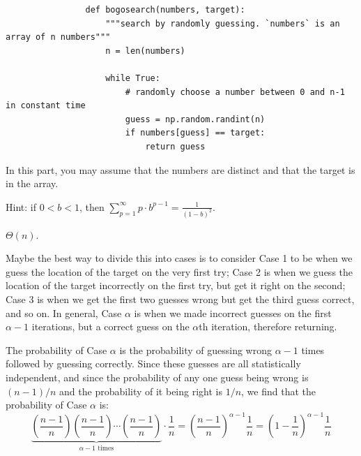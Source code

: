 \begin{prob}
\begin{subprobset}
\begin{subprob}
\begin{soln}
            \end{soln}
        \end{subprob}


        \begin{subprob}
            \begin{verbatim}
                def bogosearch(numbers, target):
                    """search by randomly guessing. `numbers` is an array of n numbers"""
                    n = len(numbers)

                    while True:
                        # randomly choose a number between 0 and n-1 in constant time
                        guess = np.random.randint(n)
                        if numbers[guess] == target:
                            return guess
            \end{verbatim}

            In this part, you may assume that the numbers are distinct and that the
            target is in the array.

            Hint: if $0 < b < 1$, then $\sum_{p = 1}^\infty p \cdot b^{p-1} = \frac{1}{(1 - b)^2}$.

            \begin{soln}
                $\Theta(n)$.

                Maybe the best way to divide this into cases is to consider Case 1 to
                be when we guess the location of the target on the very first try;
                Case 2 is when we guess the location of the target incorrectly on the
                first try, but get it right on the second; Case 3 is when we get the
                first two guesses wrong but get the third guess correct, and so on.
                In general, Case $\alpha$ is when we made incorrect guesses on the first
                $\alpha - 1$ iterations, but a correct guess on the $\alpha$th iteration,
                therefore returning.

                The probability of Case $\alpha$ is the probability of guessing wrong $\alpha - 1$
                times followed by guessing correctly. Since these guesses are all statistically
                independent, and since the probability of any one guess being wrong is
                $(n - 1)/n$ and the probability of it being right is $1/n$, we find that
                the probability of Case $\alpha$ is:
                \[
                    \underbrace{
                        \left( \frac{n-1}{n} \right)
                        \left( \frac{n-1}{n} \right)
                        \cdots
                        \left( \frac{n-1}{n} \right)
                    }_{\alpha - 1 \text{ times}}
                    \cdot \frac{1}{n}
                    =
                    \left(
                        \frac{n-1}{n}
                    \right)^{\alpha-1} \frac{1}{n}
                    =
                    \left(
                        1 - \frac{1}{n}
                    \right)^{\alpha-1} \frac{1}{n}
                \]


\end{soln}
\end{subprob}
\end{subprobset}
\end{prob}

